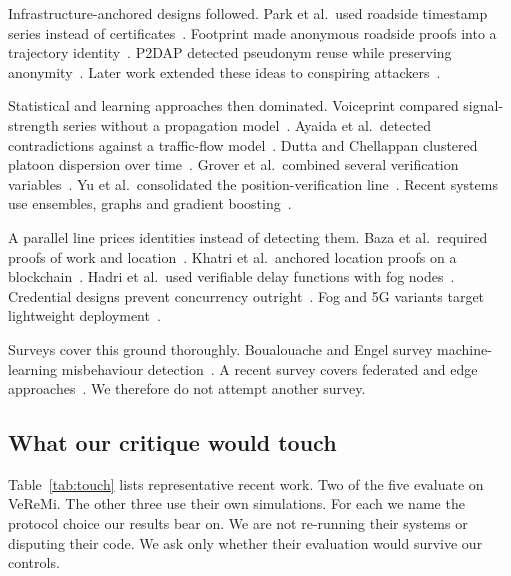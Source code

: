 \documentclass[conference]{IEEEtran}
\begin{document}
Infrastructure-anchored designs followed.
Park et al.\ used roadside timestamp series instead of certificates~\cite{park2009}.
Footprint made anonymous roadside proofs into a trajectory identity~\cite{chang2011}.
P2DAP detected pseudonym reuse while preserving anonymity~\cite{zhou2007,zhou2011}.
Later work extended these ideas to conspiring attackers~\cite{feng2016}.

Statistical and learning approaches then dominated.
Voiceprint compared signal-strength series without a propagation model~\cite{yao2017}.
Ayaida et al.\ detected contradictions against a traffic-flow model~\cite{ayaida2019}.
Dutta and Chellappan clustered platoon dispersion over time~\cite{dutta2013}.
Grover et al.\ combined several verification variables~\cite{grover2015}.
Yu et al.\ consolidated the position-verification line~\cite{yu2013}.
Recent systems use ensembles, graphs and gradient boosting~\cite{azam2022,sefati2025}.

A parallel line prices identities instead of detecting them.
Baza et al.\ required proofs of work and location~\cite{baza2020}.
Khatri et al.\ anchored location proofs on a blockchain~\cite{khatri2024}.
Hadri et al.\ used verifiable delay functions with fog nodes~\cite{hadri2026}.
Credential designs prevent concurrency outright~\cite{funderburg2021,akil2023}.
Fog and 5G variants target lightweight deployment~\cite{almazroi2024}.

Surveys cover this ground thoroughly.
Boualouache and Engel survey machine-learning misbehaviour detection~\cite{boualouache2023}.
A recent survey covers federated and edge approaches~\cite{tits2025survey}.
We therefore do not attempt another survey.

\subsection{What our critique would touch}

Table~\ref{tab:touch} lists representative recent work.
Two of the five evaluate on VeReMi.
The other three use their own simulations.
For each we name the protocol choice our results bear on.
We are not re-running their systems or disputing their code.
We ask only whether their evaluation would survive our controls.
\end{document}
